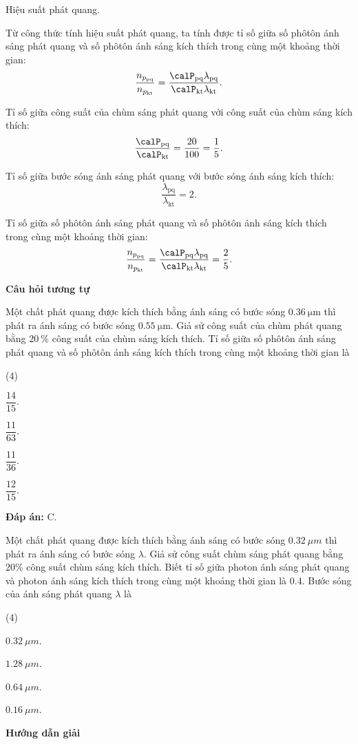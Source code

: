 \begin{dang}{Hiệu suất phát quang.}
{Từ công thức tính hiệu suất phát quang, ta tính được tỉ số giữa số phôtôn ánh sáng phát quang và số phôtôn ánh sáng kích thích trong cùng một khoảng thời gian:
\begin{equation*}
	\dfrac{n_{p_\text{pq}}} {n_{p_\text{kt}}} = \dfrac {\calP_\text{pq}\lambda_\text{pq}}{\calP_\text{kt}\lambda_\text{kt}}.
\end{equation*}

Tỉ số giữa công suất của chùm sáng phát quang với công suất của chùm sáng kích thích:
\begin{equation*}
	\dfrac{\calP_\text{pq}}{\calP_\text{kt}}=\dfrac{20}{100}=\dfrac{1}{5}.
\end{equation*}

Tỉ số giữa bước sóng ánh sáng phát quang với bước sóng ánh sáng kích thích:
\begin{equation*}
	\dfrac{\lambda_\text{pq}}{\lambda_\text{kt}}=2.
\end{equation*}

Tỉ số giữa số phôtôn ánh sáng phát quang và số phôtôn ánh sáng kích thích trong cùng một khoảng thời gian: \begin{equation*}
	\dfrac{n_{p_\text{pq}}} {n_{p_\text{kt}}} = \dfrac {\calP_\text{pq}\lambda_\text{pq}}{\calP_\text{kt}\lambda_\text{kt}}=\dfrac{2}{5}.
\end{equation*}

\begin{center}
	\textbf{Câu hỏi tương tự}
\end{center}
	Một chất phát quang được kích thích bằng ánh sáng có bước sóng $\SI{0.36}{\micro \meter}$ thì phát ra ánh sáng có bước sóng $\SI{0.55}{\micro \meter}$. Giả sử công suất của chùm phát quang bằng $\SI{20}{\percent}$ công suất của chùm sáng kích thích. Tỉ số giữa số phôtôn ánh sáng phát quang và số phôtôn ánh sáng kích thích trong cùng một khoảng thời gian là
\begin{mcq}(4)
	\item $\dfrac{14}{15}$.
	\item $\dfrac{11}{63}$.
	\item $\dfrac{11}{36}$.
	\item $\dfrac{12}{15}$.
\end{mcq}
\textbf{Đáp án:} C.
}

	{
	Một chất phát quang được kích thích bằng ánh sáng có bước sóng $ \SI{0,32}{\mu m} $ thì phát ra ánh sáng có bước sóng $\lambda $. Giả sử công suất chùm sáng phát quang bằng 20\% công suất chùm sáng kích thích. Biết tỉ số giữa photon ánh sáng phát quang và photon ánh sáng kích thích trong cùng một khoảng thời gian là $ \num{0,4} $. Bước sóng của ánh sáng phát quang $ \lambda $ là
		\begin{mcq}(4)
			\item $ \SI{0,32}{\mu m} $. 
			\item $ \SI{1,28}{\mu m} $.
			\item $ \SI{0,64}{\mu m} $. 
			\item $ \SI{0,16}{\mu m} $. 
		\end{mcq}
	}
	{
	\begin{center}
	\textbf{Hướng dẫn giải}
	\end{center}
	
}
\end{dang}
